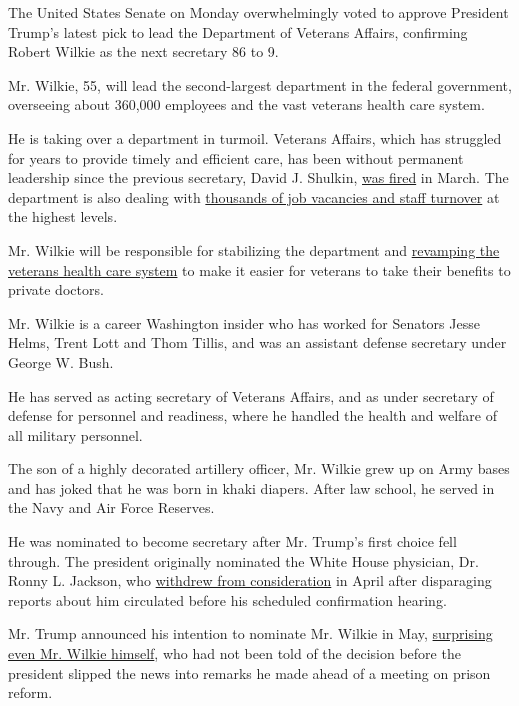 The United States Senate on Monday overwhelmingly voted to approve
President Trump's latest pick to lead the Department of Veterans
Affairs, confirming Robert Wilkie as the next secretary 86 to 9.

Mr. Wilkie, 55, will lead the second-largest department in the federal
government, overseeing about 360,000 employees and the vast veterans
health care system.

He is taking over a department in turmoil. Veterans Affairs, which has
struggled for years to provide timely and efficient care, has been
without permanent leadership since the previous secretary, David J.
Shulkin,
\href{https://www.nytimes.com/2018/03/28/us/politics/david-shulkin-veterans-affairs-trump.html}{was
fired} in March. The department is also dealing with
\href{https://www.nytimes.com/2018/05/04/us/politics/va-medical-system-chaos.html}{thousands
of job vacancies and staff turnover} at the highest levels.

Mr. Wilkie will be responsible for stabilizing the department and
\href{https://www.nytimes.com/2018/05/23/us/politics/veterans-health-care.html}{revamping
the veterans health care system} to make it easier for veterans to take
their benefits to private doctors.

Mr. Wilkie is a career Washington insider who has worked for Senators
Jesse Helms, Trent Lott and Thom Tillis, and was an assistant defense
secretary under George W. Bush.

He has served as acting secretary of Veterans Affairs, and as under
secretary of defense for personnel and readiness, where he handled the
health and welfare of all military personnel.

The son of a highly decorated artillery officer, Mr. Wilkie grew up on
Army bases and has joked that he was born in khaki diapers. After law
school, he served in the Navy and Air Force Reserves.

He was nominated to become secretary after Mr. Trump's first choice fell
through. The president originally nominated the White House physician,
Dr. Ronny L. Jackson, who
\href{https://www.nytimes.com/2018/04/29/us/politics/ronny-jackson-trump-white-house.html}{withdrew
from consideration} in April after disparaging reports about him
circulated before his scheduled confirmation hearing.

Mr. Trump announced his intention to nominate Mr. Wilkie in May,
\href{https://www.nytimes.com/2018/05/18/us/politics/trump-va-secretary-robert-wilkie.html}{surprising
even Mr. Wilkie himself}, who had not been told of the decision before
the president slipped the news into remarks he made ahead of a meeting
on prison reform.

